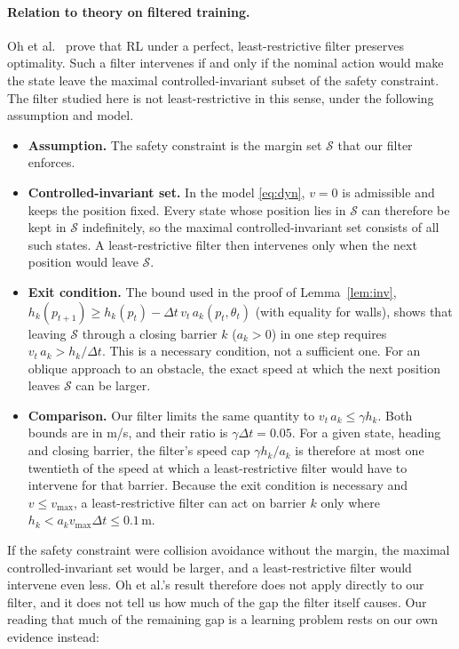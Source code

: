\documentclass[11pt]{article}
\theoremstyle{definition}
\theoremstyle{remark}
\begin{document}
\paragraph{Relation to theory on filtered training.} Oh et al.~\cite{oh2026optimal} prove that RL under a perfect, least-restrictive filter preserves optimality. Such a filter intervenes if and only if the nominal action would make the state leave the maximal controlled-invariant subset of the safety constraint. The filter studied here is not least-restrictive in this sense, under the following assumption and model.
\begin{itemize}
  \item \textbf{Assumption.} The safety constraint is the margin set $\mathcal S$ that our filter enforces.
  \item \textbf{Controlled-invariant set.} In the model \eqref{eq:dyn}, $v=0$ is admissible and keeps the position fixed. Every state whose position lies in $\mathcal S$ can therefore be kept in $\mathcal S$ indefinitely, so the maximal controlled-invariant set consists of all such states. A least-restrictive filter then intervenes only when the next position would leave $\mathcal S$.
  \item \textbf{Exit condition.} The bound used in the proof of Lemma~\ref{lem:inv}, $h_k(p_{t+1})\ge h_k(p_t)-\Delta t\,v_t\,a_k(p_t,\theta_t)$ (with equality for walls), shows that leaving $\mathcal S$ through a closing barrier $k$ ($a_k>0$) in one step requires $v_t\,a_k>h_k/\Delta t$. This is a necessary condition, not a sufficient one. For an oblique approach to an obstacle, the exact speed at which the next position leaves $\mathcal S$ can be larger.
  \item \textbf{Comparison.} Our filter limits the same quantity to $v_t\,a_k\le\gamma h_k$. Both bounds are in m/s, and their ratio is $\gamma\Delta t=0.05$. For a given state, heading and closing barrier, the filter's speed cap $\gamma h_k/a_k$ is therefore at most one twentieth of the speed at which a least-restrictive filter would have to intervene for that barrier. Because the exit condition is necessary and $v\le v_{\max}$, a least-restrictive filter can act on barrier $k$ only where $h_k<a_k v_{\max}\Delta t\le0.1$\,m.
\end{itemize}
If the safety constraint were collision avoidance without the margin, the maximal controlled-invariant set would be larger, and a least-restrictive filter would intervene even less. Oh et al.'s result therefore does not apply directly to our filter, and it does not tell us how much of the gap the filter itself causes. Our reading that much of the remaining gap is a learning problem rests on our own evidence instead:
\end{document}
